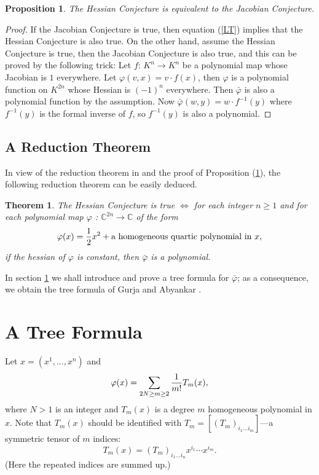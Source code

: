 \documentclass{article}
\newcommand{\bb}{\mathbb}
\newtheorem{Thm}[defn]{Theorem}
\newtheorem{Prop}[defn]{Proposition}
\newtheorem{main theorem}[defn]{Main Theorem}
\begin{document}
\begin{Prop}\label{equiv}
The Hessian Conjecture is equivalent to the Jacobian Conjecture.
\end{Prop}
\begin{proof} If the Jacobian Conjecture is true, then equation
(\ref{LT}) implies that the Hessian Conjecture is also true. On
the other hand, assume the Hessian Conjecture is true, then the
Jacobian Conjecture is also true, and this can be proved by the
following trick: Let $f$: $K^n\rightarrow K^n$ be a polynomial map
whose Jacobian is $1$ everywhere. Let $\varphi (v,x)=v\cdot f(x)$,
then $\varphi$ is a polynomial function on $K^{2n}$ whose Hessian
is $(-1)^n$ everywhere. Then $\bar\varphi$ is also a polynomial
function by the assumption. Now $\bar\varphi(w,y)=w\cdot
f^{-1}(y)$ where $f^{-1}(y)$ is the formal inverse of $f$, so
$f^{-1}(y)$ is also a polynomial.
\end{proof}

\subsection{A Reduction Theorem}\label{reduc-sec}
In view of the reduction theorem in \cite{BCW82} and the proof of
Proposition (\ref{equiv}), the following reduction theorem can be
easily deduced.

\begin{Thm} The Hessian Conjecture is true $\Leftrightarrow$  for each integer $n\ge
1$ and for each polynomial map $\varphi$ : $\bb{C}^{2n}\to\bb{C} $
of the form
\[
\varphi(x)={1\over 2}x^2+\hbox{a homogeneous quartic polynomial in
$x$},
\]
if the hessian of $\varphi$ is constant, then $\bar\varphi$ is a
polynomial.
\end{Thm}
In section \ref{tree} we shall introduce and prove a tree formula
for $\bar\varphi$; as a consequence, we obtain the tree formula of
Gurja and Abyankar \cite{Abh74, BCW82}.

\section{A Tree Formula}\label{tree}
Let  $x=(x^1,..., x^n)$ and
\begin{eqnarray}\label{varphitype}
\varphi(x)=\sum_{2N\ge m\ge 2}{1\over m!}T_m( x),
\end{eqnarray}
where $N>1$ is an integer and $T_m(x)$ is a degree $m$ homogeneous
polynomial in $x$. Note that $T_m(x)$ should be identified with
$T_m=[(T_m)_{i_1\ldots i_m}]$---a symmetric tensor of $m$ indices:
$$T_m(x)=(T_m)_{i_1\ldots i_n}x^{i_1}\cdots x^{i_m}.$$
(Here the repeated indices are summed up.)
\end{document}
